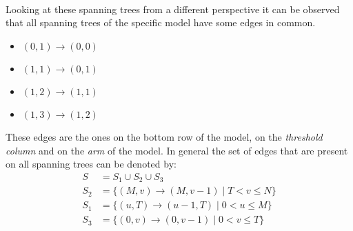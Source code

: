 \begin{figure}[H]
    \centering
    \scalebox{0.8}{
        } 
        \vspace{0.8cm} \\
    \scalebox{0.6}{
        } 
        \hspace{0.7cm}
    \scalebox{0.6}{
        } 
        \vspace{0.4cm} \\
    \scalebox{0.6}{
        } 
        \hspace{0.7cm}
    \scalebox{0.6}{
        }
        \vspace{0.4cm} \\
    \scalebox{0.6}{
        }
\end{figure}

Looking at these spanning trees from a different perspective it can be observed 
that all spanning trees of the specific model have some edges in common. 

\scriptsize
\begin{multicols}{4}
    \begin{itemize}
        \item \((0,1) \rightarrow (0,0)\)
        \item \((1,1) \rightarrow (0,1)\)
        \item \((1,2) \rightarrow (1,1)\)
        \item \((1,3) \rightarrow (1,2)\)
    \end{itemize}
\end{multicols}
\normalsize

These edges are the ones on the bottom row of the model, on the 
\textit{threshold column} and on the \textit{arm} of the model. 
In general the set of edges that are present on all spanning trees can be 
denoted by:
\begin{align} \label{eq:common_edges_set}
    S &= S_1 \cup S_2 \cup S_3 \nonumber\\
    S_2 &= \{(M,v) \rightarrow (M,v-1) \; | \; T < v \leq N\} \nonumber \\
    S_1 &= \{(u,T) \rightarrow (u-1,T) \; | \; 0 < u \leq M\} \nonumber \\
    S_3 &= \{(0,v) \rightarrow (0,v-1) \; | \; 0 < v \leq T\} \nonumber \\
\end{align}

